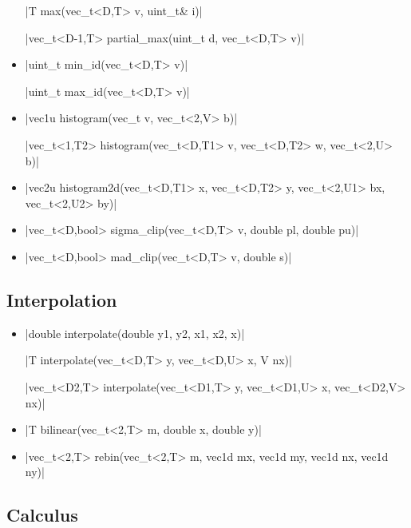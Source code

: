 \documentclass[12pt]{report}
\begin{document}
\begin{itemize}
\cppinline|T max(vec_t<D,T> v, uint_t& i)|

\cppinline|vec_t<D-1,T> partial_max(uint_t d, vec_t<D,T> v)| 

\item \cppinline|uint_t min_id(vec_t<D,T> v)| 

\cppinline|uint_t max_id(vec_t<D,T> v)| 

\item \cppinline|vec1u histogram(vec_t v, vec_t<2,V> b)| 

\cppinline|vec_t<1,T2> histogram(vec_t<D,T1> v, vec_t<D,T2> w, vec_t<2,U> b)|

\item \cppinline|vec2u histogram2d(vec_t<D,T1> x, vec_t<D,T2> y, vec_t<2,U1> bx, vec_t<2,U2> by)| 

\item \cppinline|vec_t<D,bool> sigma_clip(vec_t<D,T> v, double pl, double pu)| 

\item \cppinline|vec_t<D,bool> mad_clip(vec_t<D,T> v, double s)| 

\end{itemize}

\subsection{Interpolation}

\begin{itemize}
\item \cppinline|double interpolate(double y1, y2, x1, x2, x)| 

\cppinline|T interpolate(vec_t<D,T> y, vec_t<D,U> x, V nx)|

\cppinline|vec_t<D2,T> interpolate(vec_t<D1,T> y, vec_t<D1,U> x, vec_t<D2,V> nx)|

\item \cppinline|T bilinear(vec_t<2,T> m, double x, double y)| 

\item \cppinline|vec_t<2,T> rebin(vec_t<2,T> m, vec1d mx, vec1d my, vec1d nx, vec1d ny)| 
\end{itemize}

\subsection{Calculus}
\end{document}
